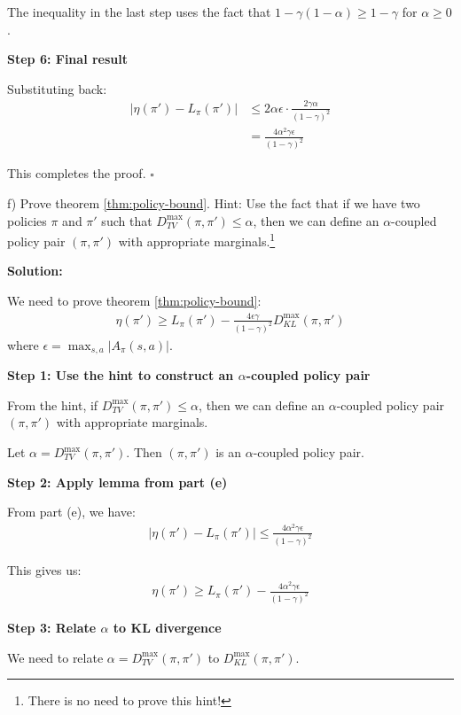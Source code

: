 The inequality in the last step uses the fact that $1-\gamma(1-\alpha) \ge 1-\gamma$ for $\alpha \ge 0$.

\textbf{Step 6: Final result}

Substituting back:
\begin{align}
|\eta(\pi') - L_{\pi}(\pi')| &\le 2\alpha\epsilon \cdot \frac{2\gamma\alpha}{(1-\gamma)^2} \\
&= \frac{4\alpha^2\gamma\epsilon}{(1-\gamma)^2}
\end{align}

This completes the proof. $\square$

f) Prove theorem \ref{thm:policy-bound}. Hint: Use the fact that if we have two policies $\pi$ and $\pi'$ such that $D_{TV}^{\max} (\pi, \pi') \le \alpha$, then we can define an $\alpha$-coupled policy pair $(\pi, \pi')$ with appropriate marginals.\footnote{There is no need to prove this hint!}

\textbf{Solution:}

We need to prove theorem \ref{thm:policy-bound}:
\begin{align*}
\eta(\pi') \ge L_{\pi}(\pi') - \frac{4\epsilon\gamma}{(1-\gamma)^2}D_{KL}^{\max}(\pi, \pi')
\end{align*}
where $\epsilon = \max_{s, a} |A_{\pi}(s, a)|$.

\textbf{Step 1: Use the hint to construct an $\alpha$-coupled policy pair}

From the hint, if $D_{TV}^{\max} (\pi, \pi') \le \alpha$, then we can define an $\alpha$-coupled policy pair $(\pi, \pi')$ with appropriate marginals.

Let $\alpha = D_{TV}^{\max} (\pi, \pi')$. Then $(\pi, \pi')$ is an $\alpha$-coupled policy pair.

\textbf{Step 2: Apply lemma from part (e)}

From part (e), we have:
\begin{align}
|\eta(\pi') - L_{\pi}(\pi')| \le \frac{4\alpha^2\gamma\epsilon}{(1-\gamma)^2}
\end{align}

This gives us:
\begin{align}
\eta(\pi') \ge L_{\pi}(\pi') - \frac{4\alpha^2\gamma\epsilon}{(1-\gamma)^2}
\end{align}

\textbf{Step 3: Relate $\alpha$ to KL divergence}

We need to relate $\alpha = D_{TV}^{\max} (\pi, \pi')$ to $D_{KL}^{\max}(\pi, \pi')$.

